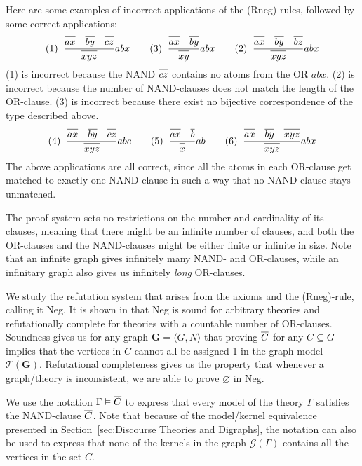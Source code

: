 Here are some examples of incorrect applications of the (Rneg)-rules, followed by some correct applications:
\begin{align}
  (1)\;\;\frac{\ol{ax}\quad\ol{by}\quad\ol{cz}}{\ol{xyz}}abx\quad\quad
  (3)\;\;\frac{\ol{ax}\quad\ol{by}}{\ol{xy}}abx\quad\quad
  (2)\;\;\frac{\ol{ax}\quad\ol{by}\quad\ol{bz}}{\ol{xyz}}abx
\end{align}
(1) is incorrect because the NAND $\ol{cz}$ contains no atoms from the OR $abx$.
(2) is incorrect because the number of NAND-clauses does not match the length of the OR-clause.
(3) is incorrect because there exist no bijective correspondence of the type described above.
\begin{align}
  (4)\;\;\frac{\ol{ax}\quad\ol{by}\quad\ol{cz}}{\ol{xyz}}abc\quad\quad
  (5)\;\;\frac{\ol{ax}\quad\ol{b}}{\ol{x}}ab\quad\quad
  (6)\;\;\frac{\ol{ax}\quad\ol{by}\quad\ol{xyz}}{\ol{xyz}}abx
\end{align}
The above applications are all correct, since all the atoms in each OR-clause get matched to exactly one NAND-clause in such a way that no NAND-clause stays unmatched.

The proof system sets no restrictions on the number and cardinality of its clauses, meaning that there might be an infinite number of clauses, and both the OR-clauses and the NAND-clauses might be either finite or infinite in size.
Note that an infinite graph gives infinitely many NAND- and OR-clauses, while an infinitary graph also gives us infinitely \textit{long} OR-clauses.

We study the refutation system that arises from the axioms and the (Rneg)-rule, calling it Neg.
It is shown in \cite{michal-completeness} that Neg is sound for arbitrary theories and refutationally complete for theories with a countable number of OR-clauses.
Soundness gives us for any graph $\mathbf{G} = \langle G,N \rangle$ that proving $\ol{C}$ for any $C \subseteq G$ implies that the vertices in $C$ cannot all be assigned 1 in the graph model $\mathcal{T}(\mathbf{G})$.
Refutational completeness gives us the property that whenever a graph/theory is inconsistent, we are able to prove $\varnothing$ in Neg.

We use the notation $\Gamma \vDash \ol{C}$ to express that every model of the theory $\Gamma$ satisfies the NAND-clause $\ol{C}$.
Note that because of the model/kernel equivalence presented in Section~\ref{sec:Discourse Theories and Digraphs}, the notation can also be used to express that none of the kernels in the graph $\mathcal{G}(\Gamma)$ contains all the vertices in the set $C$.

